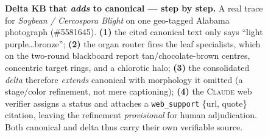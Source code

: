 \begin{figure}[t]
{
}%
\caption{\textbf{Delta KB that \emph{adds} to canonical --- step by step.} A real
trace for \emph{Soybean / Cercospora Blight} on one geo-tagged Alabama
\bugwood{} photograph (\#5581645). \textbf{(1)} the cited canonical text only
says ``light purple\dots bronze''; \textbf{(2)} the organ router fires the leaf
specialists, which on the two-round blackboard report tan/chocolate-brown
centres, concentric target rings, and a chlorotic halo; \textbf{(3)} the
consolidated \emph{delta} therefore \emph{extends} canonical with morphology it
omitted (a stage/color refinement, not mere captioning); \textbf{(4)} the
\textsc{Claude} web verifier assigns a status and attaches a \texttt{web\_support}
\{url, quote\} citation, leaving the refinement \emph{provisional} for human
adjudication. Both canonical and delta thus carry their own verifiable source.}
\label{fig:delta-trace}
\end{figure}

